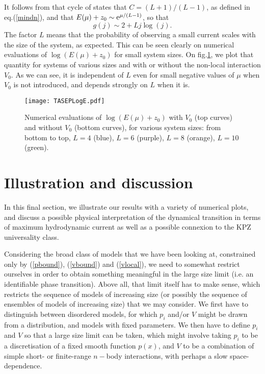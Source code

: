 \documentclass[aps,pre,onecolumn,showpacs,showkeys,a4paper]{revtex4-1}
\begin{document}
It follows from that cycle of states that $C=(L+1)/(L-1)$, as defined in eq.(\ref{mindn}), and that $E(\mu)+z_0\sim {\rm e}^{\mu/(L-1)}$, so that 
\begin{equation}\boxed{
g(j)\sim 2+Lj\log(j).
}\end{equation}
The factor $L$ means that the probability of observing a small current scales with the size of the system, as expected. This can be seen clearly on numerical evaluations of $\log(E(\mu)+z_0)$ for small system sizes. On fig.\ref{fig-LogE}, we plot that quantity for systems of various sizes and with or without the non-local interaction $V_0$. As we can see, it is independent of $L$ even for small negative values of $\mu$ when $V_0$ is not introduced, and depends strongly on $L$ when it is.

 \begin{figure}[ht]
\begin{center}
 \texttt{[image: TASEPLogE.pdf]}
  \caption{Numerical evaluations of $\log(E(\mu)+z_0)$ with $V_0$ (top curves) and without $V_0$ (bottom curves), for various system sizes: from bottom to top, $L=4$ (blue), $L=6$ (purple), $L=8$ (orange), $L=10$ (green).}
\label{fig-LogE}
 \end{center}
 \end{figure}










\newpage

\section{Illustration and discussion}
\label{V}

In this final section, we illustrate our results with a variety of numerical plots, and discuss a possible physical interpretation of the dynamical transition in terms of maximum hydrodynamic current as well as a possible connexion to the KPZ universality class.

Considering the broad class of models that we have been looking at, constrained only by (\ref{pbound}), (\ref{vbound}) and (\ref{vlocal}), we need to somewhat restrict ourselves in order to obtain something meaningful in the large size limit (i.e. an identifiable phase transition). Above all, that limit itself has to make sense, which restricts the sequence of models of increasing size (or possibly the sequence of ensembles of models of increasing size) that we may consider. We first have to distinguish between disordered models, for which $p_i$ and/or $V$ might be drawn from a distribution, and models with fixed parameters. We then have to define $p_i$ and $V$ so that a large size limit can be taken, which might involve taking $p_i$ to be a discretisation of a fixed smooth function $p(x)$, and $V$ to be a combination of simple short- or finite-range $n-$body interactions, with perhaps a slow space-dependence.
\end{document}

